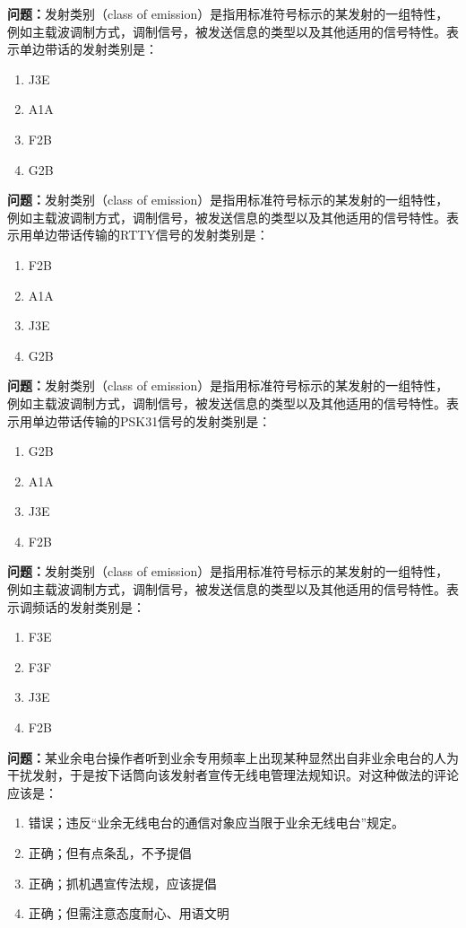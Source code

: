 \bigskip


\noindent\textbf{问题：}发射类别（class of emission）是指用标准符号标示的某发射的一组特性，例如主载波调制方式，调制信号，被发送信息的类型以及其他适用的信号特性。表示单边带话的发射类别是：
\begin{enumerate}[label=\Alph*), leftmargin=3em]
\item J3E
\item A1A
\item F2B
\item G2B
\end{enumerate}

\bigskip


\noindent\textbf{问题：}发射类别（class of emission）是指用标准符号标示的某发射的一组特性，例如主载波调制方式，调制信号，被发送信息的类型以及其他适用的信号特性。表示用单边带话传输的RTTY信号的发射类别是：
\begin{enumerate}[label=\Alph*), leftmargin=3em]
\item F2B
\item A1A
\item J3E
\item G2B
\end{enumerate}

\bigskip


\noindent\textbf{问题：}发射类别（class of emission）是指用标准符号标示的某发射的一组特性，例如主载波调制方式，调制信号，被发送信息的类型以及其他适用的信号特性。表示用单边带话传输的PSK31信号的发射类别是：
\begin{enumerate}[label=\Alph*), leftmargin=3em]
\item G2B
\item A1A
\item J3E
\item F2B
\end{enumerate}

\bigskip


\noindent\textbf{问题：}发射类别（class of emission）是指用标准符号标示的某发射的一组特性，例如主载波调制方式，调制信号，被发送信息的类型以及其他适用的信号特性。表示调频话的发射类别是：
\begin{enumerate}[label=\Alph*), leftmargin=3em]
\item F3E
\item F3F
\item J3E
\item F2B
\end{enumerate}

\bigskip


\noindent\textbf{问题：}某业余电台操作者听到业余专用频率上出现某种显然出自非业余电台的人为干扰发射，于是按下话筒向该发射者宣传无线电管理法规知识。对这种做法的评论应该是：
\begin{enumerate}[label=\Alph*), leftmargin=3em]
\item 错误；违反“业余无线电台的通信对象应当限于业余无线电台”规定。
\item 正确；但有点条乱，不予提倡
\item 正确；抓机遇宣传法规，应该提倡
\item 正确；但需注意态度耐心、用语文明
\end{enumerate}

